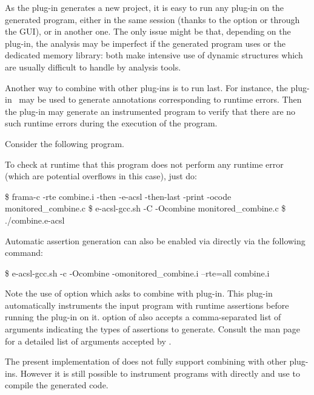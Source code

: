 As the \eacsl plug-in generates a new \framac project, it is easy to run any
plug-in on the generated program, either in the same \framac session (thanks to
the option  or through the GUI), or in another one. The only
issue might be that, depending on the plug-in, the analysis may be imperfect if
the generated program uses \gmp or the dedicated memory library: both make
intensive use of dynamic structures which are usually difficult to handle by
analysis tools.

Another way to combine \eacsl with other plug-ins is to run \eacsl last.  For
instance, the \rte plug-in~\cite{rte} may be used to generate annotations
corresponding to runtime errors. Then the \eacsl plug-in may generate an
instrumented program to verify that there are no such runtime errors during the
execution of the program.

Consider the following program.

To check at runtime that this program does not perform any runtime error (which
are potential overflows in this case), just do:

\begin{frama-c-commands}
\$ frama-c -rte combine.i -then -e-acsl -then-last -print
  -ocode monitored_combine.c
\$ e-acsl-gcc.sh -C -Ocombine monitored_combine.c
\$ ./combine.e-acsl
\end{frama-c-commands}

Automatic assertion generation can also be enabled via \eacslgcc directly via
the following command:
\begin{frama-c-commands}
\$ e-acsl-gcc.sh -c -Ocombine -omonitored_combine.i --rte=all combine.i
\end{frama-c-commands}

Note the use of \eacslgcc {} option which asks \framac to combine
\eacsl with \rte plug-in. This plug-in automatically instruments the input
program with runtime
assertions before running the \eacsl plug-in on it.   option of
\eacslgcc also accepts a comma-separated list of arguments indicating the types
of assertions to generate. Consult the \eacslgcc man page for a detailed
list of arguments accepted by .

The present implementation of \eacslgcc does not fully support combining \eacsl
with other \framac plug-ins. However it is still possible to instrument programs
with \eacsl directly and use \eacslgcc to compile the generated code.

